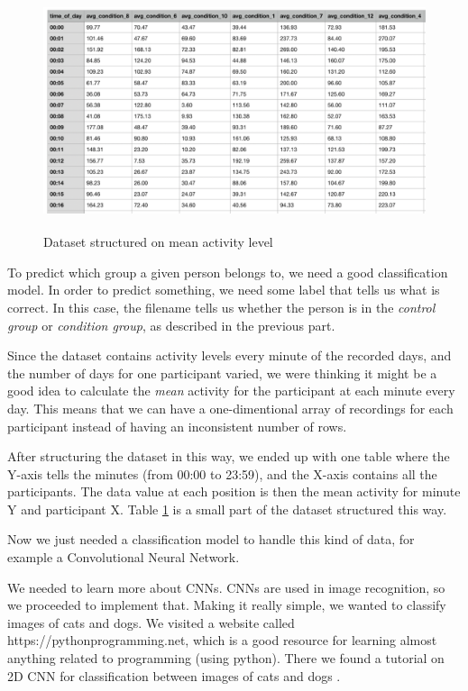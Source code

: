 \begin{figure}
  \includegraphics[height=7cm]{img/mean_by_tod.png}
  \caption{Dataset structured on mean activity level}
  \label{figure:mean_tod}
\end{figure}

To predict which group a given person belongs to, we need a good classification model. 
In order to predict something, we need some label that tells us what is correct. In this case, the filename tells us whether the person is 
in the \textit{control group} or \textit{condition group}, as described in the previous part. 

Since the dataset contains activity levels every minute of the recorded days, and the number of days for one participant varied,
we were thinking it might be a good idea to calculate the \textit{mean} activity for the participant at each minute every day.
This means that we can have a one-dimentional array of recordings for each participant instead of having an inconsistent number of rows. 

After structuring the dataset in this way, we ended up with one table where the Y-axis tells the minutes (from 00:00 to 23:59), 
and the X-axis contains all the participants. The data value at each position is then the mean activity for minute Y and participant X.
Table \ref{figure:mean_tod} is a small part of the dataset structured this way.

Now we just needed a classification model to handle this kind of data, for example a Convolutional Neural Network. 

We needed to learn more about CNNs. CNNs are used in image recognition, so we proceeded to implement that.
Making it really simple, we wanted to classify images of cats and dogs. We visited a website called https://pythonprogramming.net,
which is a good resource for learning almost anything related to programming (using python).
There we found a tutorial on 2D CNN for classification between images of cats and dogs \cite{2d_cnn}. 

